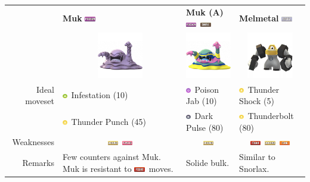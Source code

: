 \documentclass[12pt]{beamer}
\newcommand{\fightingfull}{\includegraphics[height=0.2cm]{../../images/type/full/Fighting.png}}
\newcommand{\darkfull}{\includegraphics[height=0.2cm]{../../images/type/full/Dark.png}}
\newcommand{\firefull}{\includegraphics[height=0.2cm]{../../images/type/full/Fire.png}}
\newcommand{\groundfull}{\includegraphics[height=0.2cm]{../../images/type/full/Ground.png}}
\newcommand{\psychicfull}{\includegraphics[height=0.2cm]{../../images/type/full/Psychic.png}}
\newcommand{\poisonfull}{\includegraphics[height=0.2cm]{../../images/type/full/Poison.png}}
\newcommand{\steelfull}{\includegraphics[height=0.2cm]{../../images/type/full/Steel.png}}
\newcommand{\darksimp}{\includegraphics[height=0.2cm]{../../images/type/simplified/dark.png}}
\newcommand{\electricsimp}{\includegraphics[height=0.2cm]{../../images/type/simplified/electric.png}}
\newcommand{\poisonsimp}{\includegraphics[height=0.2cm]{../../images/type/simplified/poison.png}}
\newcommand{\bugsimp}{\includegraphics[height=0.2cm]{../../images/type/simplified/bug.png}}
\begin{document}
\begin{frame}
\begin{block}{}
\begin{footnotesize}
\begin{tabular}{rp{3.2cm}p{3.2cm}p{3.2cm}}
& \textbf{Muk} \hfill \poisonfull & \textbf{Muk (A)} \hfill \poisonfull~\darkfull &  \textbf{Melmetal} \hfill \steelfull  \\ 
&\multicolumn{1}{c}{\includegraphics[width=2cm]{../../images/pokemon/Muk}} &
\multicolumn{1}{c}{\includegraphics[width=2cm]{../../images/pokemon/Muk_alola}} &
\multicolumn{1}{c}{\includegraphics[width=2cm]{../../images/pokemon/Melmetal}} \\ \hline
Ideal moveset & \bugsimp~Infestation (10) & \poisonsimp~Poison Jab (10) &  \electricsimp~Thunder Shock (5)  \\
& \electricsimp~Thunder Punch (45) & \darksimp~Dark Pulse (80)&  \electricsimp~Thunderbolt (80)  \\ \hline
Weaknesses &  \multicolumn{1}{c}{\groundfull~\psychicfull} & \multicolumn{1}{c}{\groundfull} & \multicolumn{1}{c}{\fightingfull~\groundfull~\firefull} \\ \hline
Remarks & Few counters against Muk. Muk is resistant to \fightingfull~moves. & Solide bulk. & Similar to Snorlax.  \\
\end{tabular}


\end{footnotesize}
\end{block}
\end{frame}
\end{document}
